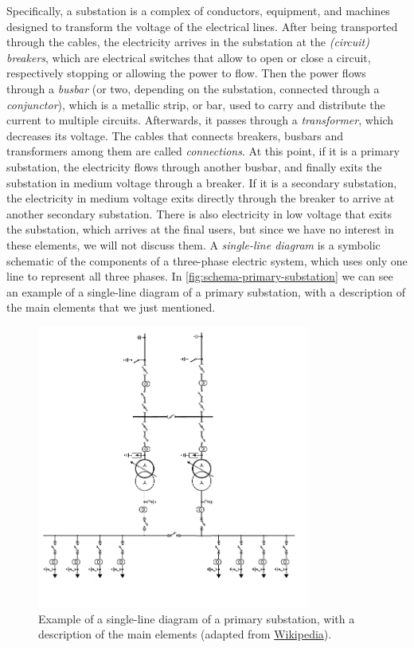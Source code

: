 Specifically, a substation is a complex of conductors, equipment, and machines designed to transform the voltage of the electrical lines. After being transported through the cables, the electricity arrives in the substation at the \emph{(circuit) breakers}, which are electrical switches that allow to open or close a circuit, respectively stopping or allowing the power to flow. Then the power flows through a \emph{busbar} (or two, depending on the substation, connected through a \emph{conjunctor}), which is a metallic strip, or bar, used to carry and distribute the current to multiple circuits. Afterwards, it passes through a \emph{transformer}, which decreases its voltage. {\color{red}The cables that connects breakers, busbars and transformers among them are called \emph{connections}.} At this point, if it is a primary substation, the electricity flows through another busbar, and finally exits the substation in medium voltage through a breaker. If it is a secondary substation, the electricity in medium voltage exits directly through the breaker to arrive at another secondary substation. There is also electricity in low voltage that exits the substation, which arrives at the final users, but since we have no interest in these elements, we will not discuss them. A \emph{single-line diagram} is a symbolic schematic of the components of a three-phase electric system, which uses only one line to represent all three phases. In \autoref{fig:schema-primary-substation} we can see an example of a single-line diagram of a primary substation, with a description of the main elements that we just mentioned.

\begin{figure}[t]
    \centering
    \includegraphics[width=0.8\textwidth]{chapters/figures/Schema_Unifilare_Cabina_Primaria.png}
    \caption{Example of a single-line diagram of a primary substation, with a description of the main elements (adapted from \href{https://it.wikipedia.org/wiki/Cabina_primaria}{Wikipedia}).}
    \label{fig:schema-primary-substation}
\end{figure}

